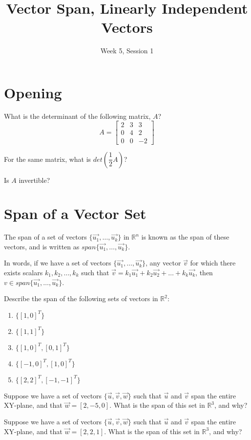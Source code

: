 \documentclass[11pt]{exam}
\title{Vector Span, Linearly Independent Vectors}
\date{Week 5, Session 1}
\begin{document}
\maketitle

\section{Opening}

\vspace{20px}
\begin{questions}
    \item What is the determinant of the following matrix, $A$?
    $$A = \begin{bmatrix} 2 & 3 & 3 \\ 0 & 4 & 2 \\ 0 & 0 & -2 \end{bmatrix}$$
    \item For the same matrix, what is $det(\dfrac{1}{2}A)$?
    \item Is $A$ invertible?
\end{questions}

\vspace{20px}
\section{Span of a Vector Set}
    The span of a set of vectors $\{ \vec{u_1}, \dots, \vec{u_k} \}$ in $\mathbb{R}^n$ is known as the span of these vectors, and
    is written as $span\{ \vec{u_1}, \dots, \vec{u_k} \}$.

    In words, if we have a set of vectors $\{ \vec{u_1}, \dots, \vec{u_k} \}$, any vector $\vec{v}$ for which there exists scalars
    $k_1, k_2, \dots, k_k$ such that $\vec{v} = k_1 \vec{u_1} + k_2 \vec{u_2} + \dots + k_k \vec{u_k}$,
    then $v \in span\{ \vec{u_1}, \dots, \vec{u_k} \}$.

    \begin{questions}
        \item Describe the span of the following sets of vectors in $\mathbb{R}^2$:
        \begin{enumerate}
            \item $\{ [1,0]^T \}$
            \item $\{ [1,1]^T \}$
            \item $\{ [1,0]^T, [0,1]^T \}$
            \item $\{ [-1,0]^T, [1,0]^T \}$
            \item $\{ [2,2]^T, [-1,-1]^T \}$
        \end{enumerate}

        \item Suppose we have a set of vectors $\{ \vec{u}, \vec{v}, \vec{w} \}$ such that $\vec{u}$ and $\vec{v}$ span the entire XY-plane,
        and that $\vec{w} = [2,-5,0]$. What is the span of this set in $\mathbb{R}^3$, and why?
        \item Suppose we have a set of vectors $\{ \vec{u}, \vec{v}, \vec{w} \}$ such that $\vec{u}$ and $\vec{v}$ span the entire XY-plane,
        and that $\vec{w} = [2, 2, 1]$. What is the span of this set in $\mathbb{R}^3$, and why?
    \end{questions}
\end{document}
